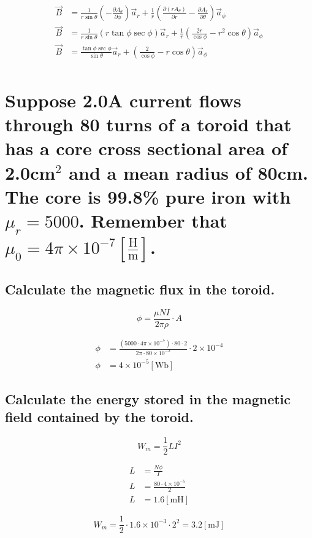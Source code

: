 \documentclass[14pt]{extarticle}
\begin{document}
\begin{align*}
	\vec{B} & =
	\frac{1}{r\sin{\theta}}\left(-\frac{\partial A_\theta}{\partial \phi}\right)\vec{a}_r+
	\frac1r\left(\frac{\partial (rA_\theta)}{\partial r}-\frac{\partial A_r}{\partial \theta}\right)\vec{a}_\phi \\
	\vec{B} & =
	\frac{1}{r\sin{\theta}}\left(r\tan{\phi}\sec{\phi}\right)\vec{a}_r+
	\frac1r\left(\frac{2r}{\cos{\phi}}-r^2\cos{\theta}\right)\vec{a}_\phi                                        \\
	\vec{B} & =
	\frac{\tan{\phi}\sec{\phi}}{\sin{\theta}}\vec{a}_r+
	\left(\frac{2}{\cos{\phi}}-r\cos{\theta}\right)\vec{a}_\phi                                                  \\
\end{align*}

\boldmath
\section{Suppose 2.0A current flows through 80 turns of
  a toroid that has a core cross sectional area of
  2.0cm$^2$ and a mean radius of 80cm. The core is
  99.8\% pure iron with $\mu_r=5000$. Remember that
  $\mu_0=4\pi\times 10^{-7}\mathrm{\left[\frac{H}{m}\right]}$.}
\unboldmath

\boldmath
\subsection{Calculate the magnetic flux in the toroid.}
\unboldmath

$$\phi = \frac{\mu NI}{2\pi\rho}\cdot A$$

\begin{align*}
	\phi & =
	\frac
	{(5000\cdot4\pi\times10^{-7})\cdot80\cdot2}
	{2\pi\cdot80\times10^{-2}}
	\cdot 2\times10^{-4}                            \\
	\phi & = 4\times10^{-5}\left[\mathrm{Wb}\right]
\end{align*}

\boldmath
\subsection{Calculate the energy stored in the magnetic field contained
	by the toroid.}
\unboldmath

$$W_m=\frac12LI^2$$

\begin{align*}
	L & =\frac{N\phi}{I}                 \\
	L & =\frac{80\cdot4\times10^{-5}}{2} \\
	L & = 1.6\left[\mathrm{mH}\right]
\end{align*}

$$W_m=\frac12\cdot1.6\times10^{-3}\cdot2^2=3.2\left[\mathrm{mJ}\right]$$
\end{document}
